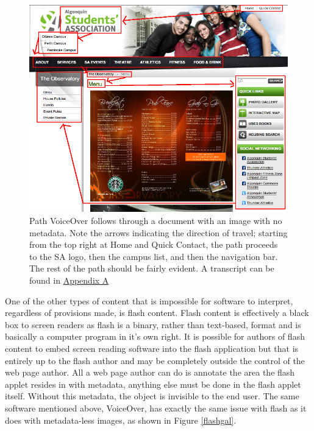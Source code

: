 \documentclass[]{article}
\begin{document}
\begin{figure}[htbp]
\centering
\includegraphics{alg_menu_vo_path.png}
\caption{Path VoiceOver follows through a document with an image with no
metadata. Note the arrows indicating the direction of travel; starting
from the top right at Home and Quick Contact, the path proceeds to the
SA logo, then the campus list, and then the navigation bar. The rest of
the path should be fairly evident. A transcript can be found in
\hyperref[transcript-of-an-inaccessible-page-with-an-image]{Appendix
A}\label{menuimg}}
\end{figure}

\clearpage

One of the other types of content that is impossible for software to
interpret, regardless of provisions made, is flash content. Flash
content is effectively a black box to screen readers as flash is a
binary, rather than text-based, format and is basically a computer
program in it's own right. It is possible for authors of flash content
to embed screen reading software into the flash application but that is
entirely up to the flash author and may be completely outside the
control of the web page author. All a web page author can do is annotate
the area the flash applet resides in with metadata, anything else must
be done in the flash applet itself. Without this metadata, the object is
invisible to the end user. The same software mentioned above, VoiceOver,
has exactly the same issue with flash as it does with metadata-less
images, as shown in Figure \ref{flashgal}.
\end{document}
